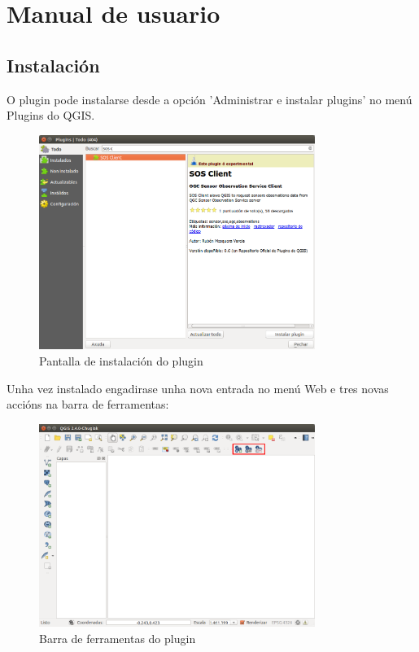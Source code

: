 \chapter{Manual de usuario}
\section{Instalación}
O plugin pode instalarse desde a opción 'Administrar e instalar plugins' no menú Plugins do QGIS.
\begin{figure}[hbtp]
\centering
\includegraphics[width=0.8\textwidth]{images/manual/instalar.png}
\caption{Pantalla de instalación do plugin}
\label{fig:install}
\end{figure}

Unha vez instalado engadirase unha nova entrada no menú Web e tres novas accións na barra de ferramentas:
\begin{figure}[H]
\centering
\includegraphics[width=0.8\textwidth]{images/manual/toolbar.png}
\caption{Barra de ferramentas do plugin}
\label{fig:toolbar}
\end{figure}

